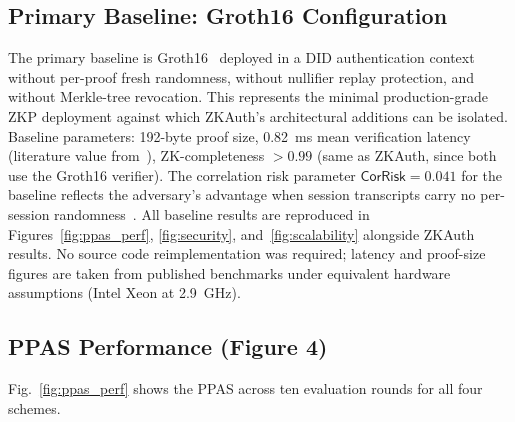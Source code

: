 \documentclass[journal,12pt,onecolumn]{IEEEtran}
\begin{document}
\subsection{Primary Baseline: Groth16 Configuration}
\label{sec:baseline}

The primary baseline is Groth16~\cite{groth2016size} deployed in a
DID authentication context without per-proof fresh randomness, without
nullifier replay protection, and without Merkle-tree revocation. This
represents the minimal production-grade ZKP deployment against which
ZKAuth's architectural additions can be isolated. Baseline parameters:
192-byte proof size, 0.82~ms mean verification latency (literature
value from~\cite{groth2016size}), ZK-completeness $> 0.99$ (same as
ZKAuth, since both use the Groth16 verifier). The correlation risk
parameter $\mathsf{CorRisk} = 0.041$ for the baseline reflects the
adversary's advantage when session transcripts carry no per-session
randomness~\cite{cheng2024correlation}. All baseline results are
reproduced in Figures~\ref{fig:ppas_perf}, \ref{fig:security},
and~\ref{fig:scalability} alongside ZKAuth results. No source code
reimplementation was required; latency and proof-size figures are
taken from published benchmarks under equivalent hardware assumptions
(Intel Xeon at 2.9~GHz).

\subsection{PPAS Performance (Figure 4)}

Fig.~\ref{fig:ppas_perf} shows the PPAS across ten evaluation rounds
for all four schemes.
\end{document}
